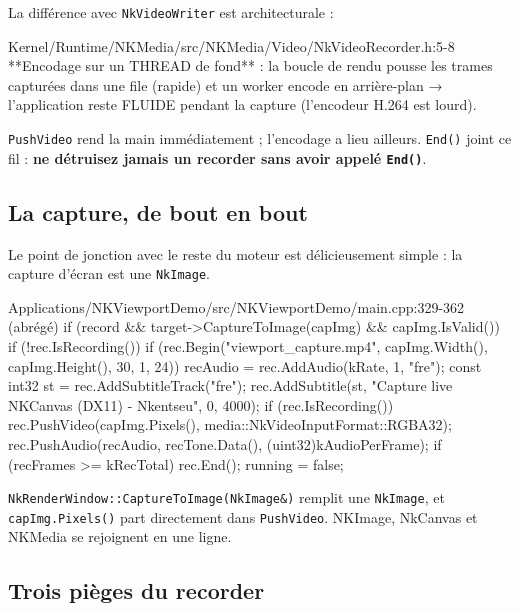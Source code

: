 La différence avec \texttt{NkVideoWriter} est architecturale :

\begin{nkcode}{Kernel/Runtime/NKMedia/src/NKMedia/Video/NkVideoRecorder.h:5-8}
 **Encodage sur un THREAD de fond** : la boucle de rendu pousse les trames capturées
 dans une file (rapide) et un worker encode en arrière-plan → l'application reste
 FLUIDE pendant la capture (l'encodeur H.264 est lourd).
\end{nkcode}

\texttt{PushVideo} rend la main immédiatement ; l'encodage a lieu ailleurs.
\texttt{End()} joint ce fil : \textbf{ne détruisez jamais un recorder sans avoir
appelé \texttt{End()}}.

\subsection{La capture, de bout en bout}

Le point de jonction avec le reste du moteur est délicieusement simple : la
capture d'écran est une \texttt{NkImage}.

\begin{nkcode}{Applications/NKViewportDemo/src/NKViewportDemo/main.cpp:329-362 (abrégé)}
        if (record && target->CaptureToImage(capImg) && capImg.IsValid()) {
            if (!rec.IsRecording()) {
                if (rec.Begin("viewport_capture.mp4", capImg.Width(), capImg.Height(), 30, 1, 24)) {
                    recAudio = rec.AddAudio(kRate, 1, "fre");
                    const int32 st = rec.AddSubtitleTrack("fre");
                    rec.AddSubtitle(st, "Capture live NKCanvas (DX11) - Nkentseu", 0, 4000);
                }
            }
            if (rec.IsRecording()) {
                rec.PushVideo(capImg.Pixels(), media::NkVideoInputFormat::RGBA32);
                rec.PushAudio(recAudio, recTone.Data(), (uint32)kAudioPerFrame);
                if (recFrames >= kRecTotal) { rec.End(); running = false; }
            }
        }
\end{nkcode}

\texttt{NkRenderWindow::CaptureToImage(NkImage\&)} remplit une \texttt{NkImage},
et \texttt{capImg.Pixels()} part directement dans \texttt{PushVideo}. NKImage,
NkCanvas et NKMedia se rejoignent en une ligne.

\subsection{Trois pièges du recorder}

